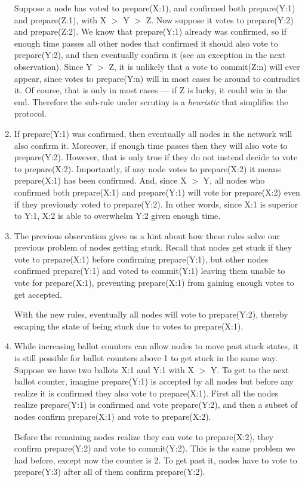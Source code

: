 \begin{enumerate}
    Suppose a node has voted to prepare(X:1), and confirmed both prepare(Y:1) and prepare(Z:1), with X $>$ Y $>$ Z. Now suppose it votes to prepare(Y:2) and prepare(Z:2). We know that prepare(Y:1) already was confirmed, so if enough time passes all other nodes that confirmed it should also vote to prepare(Y:2), and then eventually confirm it (see an exception in the next observation). Since Y $>$ Z, it is unlikely that a vote to commit(Z:n) will ever appear, since votes to prepare(Y:n) will in most cases be around to contradict it. Of course, that is only in most cases --- if Z is lucky, it could win in the end. Therefore the sub-rule under scrutiny is a {\em heuristic} that simplifies the protocol.

    \item If prepare(Y:1) was confirmed, then eventually all nodes in the network will also confirm it. Moreover, if enough time passes then they will also vote to prepare(Y:2). However, that is only true if they do not instead decide to vote to prepare(X:2). Importantly, if any node votes to prepare(X:2) it means prepare(X:1) has been confirmed. And, since X $>$ Y, all nodes who confirmed both prepare(X:1) and prepare(Y:1) will vote for prepare(X:2) even if they previously voted to prepare(Y:2). In other words, since X:1 is superior to Y:1, X:2 is able to overwhelm Y:2 given enough time.

    \item The previous observation gives us a hint about how these rules solve our previous problem of nodes getting stuck. Recall that nodes get stuck if they vote to prepare(X:1) before confirming prepare(Y:1), but other nodes confirmed prepare(Y:1) and voted to commit(Y:1) leaving them unable to vote for prepare(X:1), preventing prepare(X:1) from gaining enough votes to get accepted.

    With the new rules, eventually all nodes will vote to prepare(Y:2), thereby escaping the state of being stuck due to votes to prepare(X:1).

    \item While increasing ballot counters can allow nodes to move past stuck states, it is still possible for ballot counters above 1 to get stuck in the same way. Suppose we have two ballots X:1 and Y:1 with X $>$ Y. To get to the next ballot counter, imagine prepare(Y:1) is accepted by all nodes but before any realize it is confirmed they also vote to prepare(X:1). First all the nodes realize prepare(Y:1) is confirmed and vote prepare(Y:2), and then a subset of nodes confirm prepare(X:1) and vote to prepare(X:2).

    Before the remaining nodes realize they can vote to prepare(X:2), they confirm prepare(Y:2) and vote to commit(Y:2). This is the same problem we had before, except now the counter is 2. To get past it, nodes have to vote to prepare(Y:3) after all of them confirm prepare(Y:2).
\end{enumerate}


